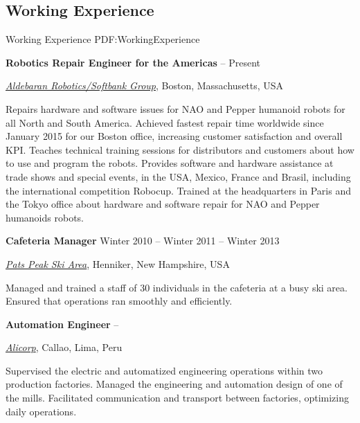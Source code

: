 \documentclass[letterpaper,MMMyyyy,nonstop]{simpleresumecv}
\begin{document}
\begin{body}
\section
{Working Experience}
{Working Experience}
{PDF:WorkingExperience}

\textbf{Robotics Repair Engineer for the Americas}
\hfill
{} --
Present 
\begin{detail}
\normalsize{ \href{https://www.aldebaran.com/en}
{\textit{Aldebaran Robotics/Softbank Group}},
Boston, Massachusetts, USA }
\end{detail}

\GapNoBreak
\BulletItem
Repairs hardware and software issues for NAO and Pepper humanoid robots for all North and South America. 
\BulletItem
Achieved fastest repair time worldwide since January 2015 for our Boston office, increasing customer satisfaction and overall KPI.
\BulletItem
Teaches technical training sessions for distributors and customers about how to use and program the robots.
\BulletItem
Provides software and hardware assistance at trade shows and special events, in the USA, Mexico, France and Brasil, including the international competition Robocup.
\BulletItem
Trained at the headquarters in Paris and the Tokyo office about hardware and software repair for NAO and Pepper humanoids robots.

\BigGap
\textbf{Cafeteria Manager}
\hfill
Winter 2010 --
Winter 2011 --
Winter 2013
\begin{detail}
\normalsize{ \href{http://www.patspeak.com/}
{\textit{Pats Peak Ski Area}},
Henniker, New Hampshire, USA }
\end{detail}

\GapNoBreak
\BulletItem
Managed and trained a staff of 30 individuals in the cafeteria at a busy ski area.
\BulletItem
Ensured that operations ran smoothly and efficiently.

\BigGap
\textbf{Automation Engineer}
\hfill
{} --
\begin{detail}
\normalsize{ \href{http://www.alicorp.com.pe/alicorp/index.html}
{\textit{Alicorp}},
Callao, Lima, Peru }
\end{detail}

\GapNoBreak
\BulletItem
Supervised the electric and automatized engineering operations within two production factories.
\BulletItem
Managed the engineering and automation design of one of the mills. Facilitated communication and transport between factories, optimizing daily operations.


\end{body}
\end{document}
